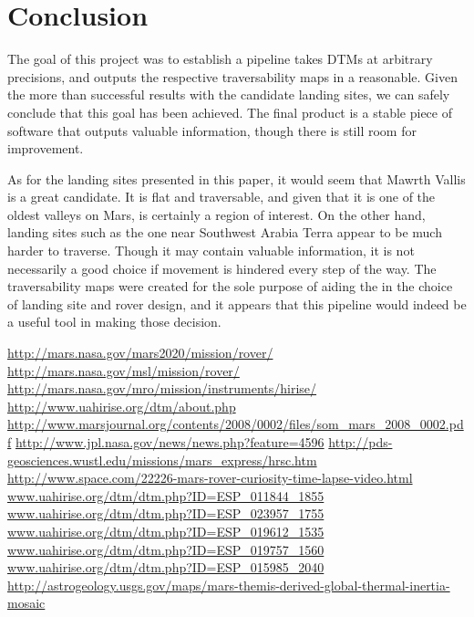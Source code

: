 \documentclass[12pt]{article}
\begin{document}
\section{Conclusion}
\label{sec:conclusion}
\par The goal of this project was to establish a pipeline takes DTMs at arbitrary precisions, and outputs the respective traversability maps in a reasonable. Given the more than successful results with the candidate landing sites, we can safely conclude that this goal has been achieved. The final product is a stable piece of software that outputs valuable information, though there is still room for improvement.
\par As for the landing sites presented in this paper, it would seem that Mawrth Vallis is a great candidate. It is flat and traversable, and given that it is one of the oldest valleys on Mars, is certainly a region of interest. On the other hand, landing sites such as the one near Southwest Arabia Terra appear to be much harder to traverse. Though it may contain valuable information, it is not necessarily a good choice if movement is hindered every step of the way. The traversability maps were created for the sole purpose of aiding the in the choice of landing site and rover design, and it appears that this pipeline would indeed be a useful tool in making those decision.

\clearpage
\begin{thebibliography}{30}
  \url{http://mars.nasa.gov/mars2020/mission/rover/}
  \url{http://mars.nasa.gov/msl/mission/rover/}
  \url{http://mars.nasa.gov/mro/mission/instruments/hirise/}
  \url{http://www.uahirise.org/dtm/about.php}
  \url{http://www.marsjournal.org/contents/2008/0002/files/som_mars_2008_0002.pdf}
  \url{http://www.jpl.nasa.gov/news/news.php?feature=4596}
  \url{http://pds-geosciences.wustl.edu/missions/mars_express/hrsc.htm}
  \url{http://www.space.com/22226-mars-rover-curiosity-time-lapse-video.html}
  \url{www.uahirise.org/dtm/dtm.php?ID=ESP_011844_1855}
  \url{www.uahirise.org/dtm/dtm.php?ID=ESP_023957_1755}
  \url{www.uahirise.org/dtm/dtm.php?ID=ESP_019612_1535}
  \url{www.uahirise.org/dtm/dtm.php?ID=ESP_019757_1560}
  \url{www.uahirise.org/dtm/dtm.php?ID=ESP_015985_2040}
  \url{http://astrogeology.usgs.gov/maps/mars-themis-derived-global-thermal-inertia-mosaic}
\end{thebibliography}
\end{document}
